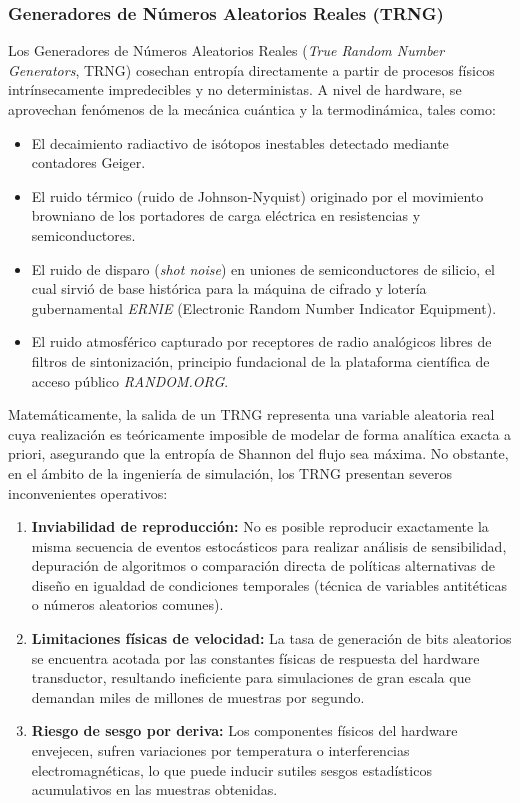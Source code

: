\documentclass{article}
\begin{document}
\subsubsection{Generadores de Números Aleatorios Reales (TRNG)}
Los Generadores de Números Aleatorios Reales (\emph{True Random Number Generators}, TRNG) cosechan entropía directamente a partir de procesos físicos intrínsecamente impredecibles y no deterministas. A nivel de hardware, se aprovechan fenómenos de la mecánica cuántica y la termodinámica, tales como:
\begin{itemize}
    \item El decaimiento radiactivo de isótopos inestables detectado mediante contadores Geiger.
    \item El ruido térmico (ruido de Johnson-Nyquist) originado por el movimiento browniano de los portadores de carga eléctrica en resistencias y semiconductores.
    \item El ruido de disparo (\emph{shot noise}) en uniones de semiconductores de silicio, el cual sirvió de base histórica para la máquina de cifrado y lotería gubernamental \emph{ERNIE} (Electronic Random Number Indicator Equipment).
    \item El ruido atmosférico capturado por receptores de radio analógicos libres de filtros de sintonización, principio fundacional de la plataforma científica de acceso público \emph{RANDOM.ORG}.
\end{itemize}

Matemáticamente, la salida de un TRNG representa una variable aleatoria real cuya realización es teóricamente imposible de modelar de forma analítica exacta a priori, asegurando que la entropía de Shannon del flujo sea máxima. No obstante, en el ámbito de la ingeniería de simulación, los TRNG presentan severos inconvenientes operativos:
\begin{enumerate}
    \item \textbf{Inviabilidad de reproducción:} No es posible reproducir exactamente la misma secuencia de eventos estocásticos para realizar análisis de sensibilidad, depuración de algoritmos o comparación directa de políticas alternativas de diseño en igualdad de condiciones temporales (técnica de variables antitéticas o números aleatorios comunes).
    \item \textbf{Limitaciones físicas de velocidad:} La tasa de generación de bits aleatorios se encuentra acotada por las constantes físicas de respuesta del hardware transductor, resultando ineficiente para simulaciones de gran escala que demandan miles de millones de muestras por segundo.
    \item \textbf{Riesgo de sesgo por deriva:} Los componentes físicos del hardware envejecen, sufren variaciones por temperatura o interferencias electromagnéticas, lo que puede inducir sutiles sesgos estadísticos acumulativos en las muestras obtenidas.
\end{enumerate}
\end{document}

